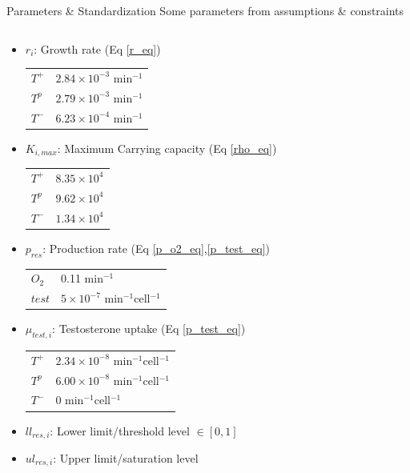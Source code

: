 \documentclass[aspectratio=169,9pt]{beamer}
\begin{document}
\begin{frame}{Parameters \& Standardization}
  Some parameters from assumptions \& constraints
  \begin{columns}
    \begin{column}{0.5\textwidth}
      \begin{itemize}
        \item $r_i$: Growth rate (Eq \ref{r_eq})\\
        \begin{tabular}{ll}
          $T^+$ & $2.84 \times 10^{-3}$ min$^{-1}$\\
          $T^p$ & $2.79 \times 10^{-3}$ min$^{-1}$\\
          $T^-$ & $6.23 \times 10^{-4}$ min$^{-1}$\\
        \end{tabular}
        \item $K_{i,max}$: Maximum Carrying capacity (Eq \ref{rho_eq})\\
        \begin{tabular}{ll}
          $T^+$ & $8.35 \times 10^4$ \\
          $T^p$ & $9.62 \times 10^4$ \\
          $T^-$ & $1.34 \times 10^4$ \\
        \end{tabular}
        \item $p_{res}$: Production rate (Eq \ref{p_o2_eq},\ref{p_test_eq})\\
        \begin{tabular}{ll}
          $O_2$ & 0.11 min$^{-1}$\\
          $test$ & $5 \times 10^{-7}$ min$^{-1}$cell$^{-1}$\\
        \end{tabular}
        \item $\mu_{test,i}$: Testosterone uptake (Eq \ref{p_test_eq})\\
        \begin{tabular}{ll}
          $T^+$ & $2.34 \times 10^{-8}$ min$^{-1}$cell$^{-1}$\\
          $T^p$ & $6.00 \times 10^{-8}$ min$^{-1}$cell$^{-1}$\\
          $T^-$ & 0 min$^{-1}$cell$^{-1}$\\
        \end{tabular}
        \item $ll_{res,i}$: Lower limit/threshold level
        $\in [0,1]$
        \item $ul_{res,i}$: Upper limit/saturation level

\end{itemize}
\end{column}
\end{columns}
\end{frame}
\end{document}
